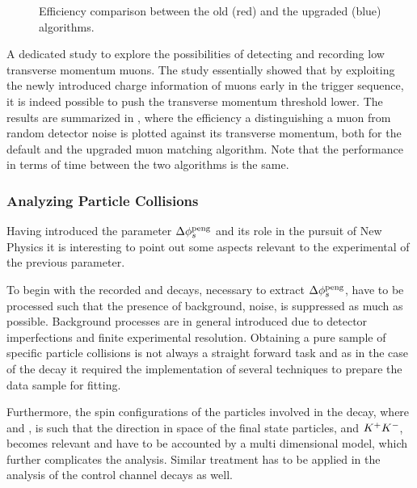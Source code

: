 \begin{figure}[t]
  \begin{subfigure}{0.5\textwidth}
    \raggedright
    \scalebox{.6}{}
    \label{app_eff_pt_zoom_comp}
  \end{subfigure}%
  \hfill
  \begin{subfigure}{0.5\textwidth}
    \raggedleft
    \scalebox{.6}{}
    \label{app_eff_p_comp}
  \end{subfigure}
    \caption{Efficiency comparison between the old (red) and the upgraded (blue) algorithms.}
  \label{app_eff_comp}
\end{figure}

A dedicated study to explore the possibilities of detecting and recording low transverse momentum
muons. The study essentially showed that by exploiting the newly introduced charge information of
muons early in the trigger sequence, it is indeed possible to push the transverse momentum
threshold lower. The results are summarized in , where the efficiency
a distinguishing a muon from random detector noise is plotted against its transverse momentum,
both for the default and the upgraded muon matching algorithm. Note that the performance in
terms of time between the two algorithms is the same.


\subsubsection{Analyzing Particle Collisions}
Having introduced the parameter $\Delta\phi_{s}^{\tiny\text{peng}}$ and its role in the pursuit of New Physics
it is interesting to point out some aspects relevant to the experimental of the previous parameter.

To begin with the recorded \BsJpsiKst and \BsJpsiRho decays, necessary to extract $\Delta\phi_{s}^{\tiny\text{peng}}$,
have to be processed such that the presence of background, noise, is suppressed as much as possible.
Background processes are in general introduced due to detector imperfections and finite experimental
resolution. Obtaining a pure sample of specific particle collisions is not always a straight forward
task and as in the case of the \BsJpsiKst decay it required the implementation of several techniques to
prepare the data sample for fitting.

Furthermore, the spin configurations of the particles involved in the \BsJpsiPhi decay, where
\Jpsimumu and \phiKK, is such that the direction in space of the final state particles, \mumu
and $K^+K^-$, becomes relevant and have to be accounted by a multi dimensional model, which further
complicates the analysis. Similar treatment has to be applied in the analysis of the control
channel decays as well.

